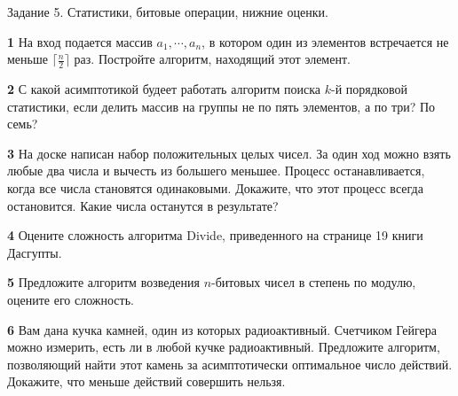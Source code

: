 \documentclass{article}
\begin{document}
\begin{center}
\Large {Задание 5. Статистики, битовые операции, нижние оценки.}
\end{center}

\bigskip

\textbf{1} На вход подается массив $a_1, \cdots, a_n$, в котором один из элементов встречается не меньше $\lceil \frac{n}{2} \rceil$ раз. Постройте алгоритм, находящий этот элемент.

\medskip

\textbf{2} С какой асимптотикой будеет работать алгоритм поиска $k$-й порядковой статистики, если делить массив на группы не по пять элементов, а по три? По семь?

\medskip

\textbf{3} На доске написан набор положительных целых чисел. За один ход можно взять любые два числа и вычесть из большего меньшее. Процесс останавливается, когда все числа становятся одинаковыми. Докажите, что этот процесс всегда остановится. Какие числа останутся в результате?

\medskip

\textbf{4} Оцените сложность алгоритма Divide, приведенного на странице 19 книги Дасгупты.

\medskip

\textbf{5} Предложите алгоритм возведения $n$-битовых чисел в степень по модулю, оцените его сложность.

\medskip

\textbf{6} Вам дана кучка камней, один из которых радиоактивный. Счетчиком Гейгера можно измерить, есть ли в любой кучке радиоактивный. Предложите алгоритм, позволяющий найти этот камень за асимптотически оптимальное число действий. Докажите, что меньше действий совершить нельзя.








\end{document}
